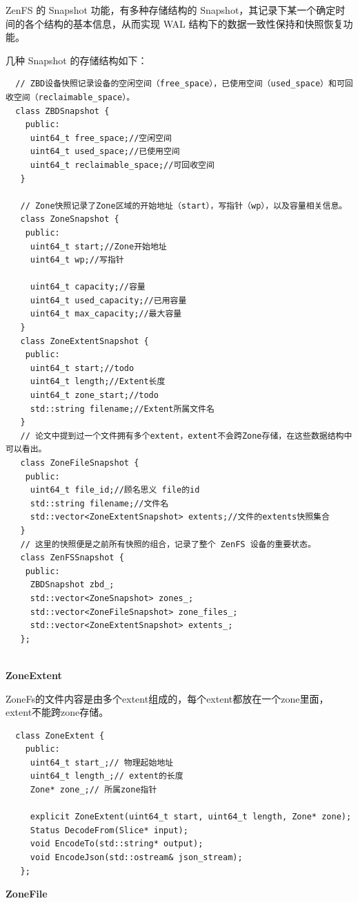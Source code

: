 ZenFS 的 Snapshot 功能，有多种存储结构的 Snapshot，其记录下某一个确定时间的各个结构的基本信息，从而实现 WAL 结构下的数据一致性保持和快照恢复功能。

几种 Snapshot 的存储结构如下：

\begin{lstlisting}
  // ZBD设备快照记录设备的空闲空间（free_space），已使用空间（used_space）和可回收空间（reclaimable_space）。
  class ZBDSnapshot {
    public:
     uint64_t free_space;//空闲空间
     uint64_t used_space;//已使用空间
     uint64_t reclaimable_space;//可回收空间
   }

   // Zone快照记录了Zone区域的开始地址（start），写指针（wp），以及容量相关信息。
   class ZoneSnapshot {
    public:
     uint64_t start;//Zone开始地址
     uint64_t wp;//写指针
   
     uint64_t capacity;//容量
     uint64_t used_capacity;//已用容量
     uint64_t max_capacity;//最大容量
   }
   class ZoneExtentSnapshot {
    public:
     uint64_t start;//todo
     uint64_t length;//Extent长度
     uint64_t zone_start;//todo
     std::string filename;//Extent所属文件名
   }
   // 论文中提到过一个文件拥有多个extent，extent不会跨Zone存储，在这些数据结构中可以看出。
   class ZoneFileSnapshot {
    public:
     uint64_t file_id;//顾名思义 file的id
     std::string filename;//文件名
     std::vector<ZoneExtentSnapshot> extents;//文件的extents快照集合
   }
   // 这里的快照便是之前所有快照的组合，记录了整个 ZenFS 设备的重要状态。
   class ZenFSSnapshot {
    public:
     ZBDSnapshot zbd_;
     std::vector<ZoneSnapshot> zones_;
     std::vector<ZoneFileSnapshot> zone_files_;
     std::vector<ZoneExtentSnapshot> extents_;
   };
   
\end{lstlisting}

\textbf{ZoneExtent}

ZoneFs的文件内容是由多个extent组成的，每个extent都放在一个zone里面，extent不能跨zone存储。

\begin{lstlisting}
  class ZoneExtent {
    public:
     uint64_t start_;// 物理起始地址
     uint64_t length_;// extent的长度
     Zone* zone_;// 所属zone指针
   
     explicit ZoneExtent(uint64_t start, uint64_t length, Zone* zone);
     Status DecodeFrom(Slice* input);
     void EncodeTo(std::string* output);
     void EncodeJson(std::ostream& json_stream);
   };   
\end{lstlisting}

\textbf{ZoneFile}


